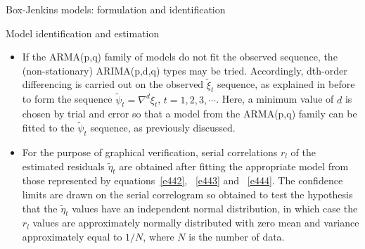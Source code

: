 \documentclass[8pt]{beamer}
\renewcommand{\emph}[1]{\textcolor{myorange}{#1}}
\begin{document}
 \begin{frame}{Box-Jenkins models: formulation and identification}
    \begin{block}{Model identification and estimation}
    \end{block}
    \begin{itemize} 
        \item If the \emph{ARMA(p,q)} family of models do not fit the observed sequence, the (non-stationary) \emph{ARIMA(p,d,q)} types may be tried. Accordingly, dth-order differencing is carried out on the observed $\tilde{\xi}_t$ sequence, as explained in before to form the sequence $\tilde{\psi}_t = \nabla^d \xi_t$, $t=1,2,3, \cdots$. Here, a minimum value of $d$ is chosen by trial and error so that a model from the \emph{ARMA(p,q)} family can be fitted to the $\tilde{\psi}_t$ sequence, as previously discussed. 
        \item For the purpose of graphical verification, \emph{serial correlations} $r_l$ of the estimated residuals $\tilde{\eta}_t$ are obtained after fitting the appropriate model from those represented by equations~\ref{e442}, ~\ref{e443} and ~\ref{e444}. The \emph{confidence limits} are drawn on the \emph{serial correlogram} so obtained to test the hypothesis that the $\tilde{\eta}_t$ values have an independent \emph{normal distribution}, in which case the $r_l$ values are approximately \emph{normally distributed} with zero mean and variance approximately equal to $1/N$, where $N$ is the number of data.  
    \end{itemize} 
\end{frame}
 
\end{document}
